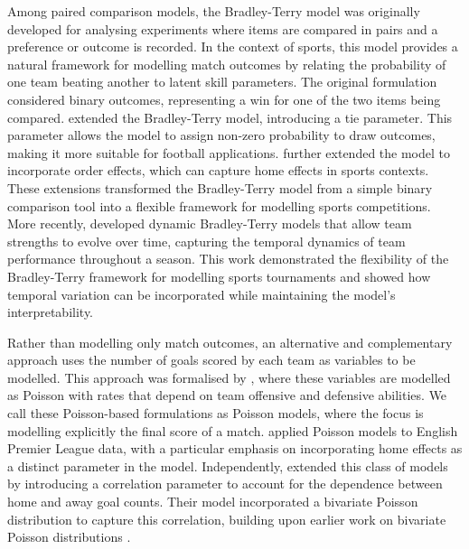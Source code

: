 Among paired comparison models, the Bradley-Terry model \cite{bradley_terry_1952} was originally developed for analysing experiments where items are compared in pairs and a preference or outcome is recorded.
In the context of sports, this model provides a natural framework for modelling match outcomes by relating the probability of one team beating another to latent skill parameters.
The original formulation considered binary outcomes, representing a win for one of the two items being compared.
\textcite{davidson_1970} extended the Bradley-Terry model, introducing a tie parameter.
This parameter allows the model to assign non-zero probability to draw outcomes, making it more suitable for football applications.
\textcite{davidson_1977} further extended the model to incorporate order effects, which can capture home effects in sports contexts.
These extensions transformed the Bradley-Terry model from a simple binary comparison tool into a flexible framework for modelling sports competitions.
More recently, \textcite{cattelan_2013} developed dynamic Bradley-Terry models that allow team strengths to evolve over time, capturing the temporal dynamics of team performance throughout a season.
This work demonstrated the flexibility of the Bradley-Terry framework for modelling sports tournaments and showed how temporal variation can be incorporated while maintaining the model's interpretability.

Rather than modelling only match outcomes, an alternative and complementary approach uses the number of goals scored by each team as variables to be modelled.
This approach was formalised by \textcite{maher_1982}, where these variables are modelled as Poisson with rates that depend on team offensive and defensive abilities.
We call these Poisson-based formulations as Poisson models, where the focus is modelling explicitly the final score of a match.
\textcite{lee_1997} applied Poisson models to English Premier League data, with a particular emphasis on incorporating home effects as a distinct parameter in the model.
Independently, \textcite{dixon_1997} extended this class of models by introducing a correlation parameter to account for the dependence between home and away goal counts.
Their model incorporated a bivariate Poisson distribution to capture this correlation, building upon earlier work on bivariate Poisson distributions \cite{holgate_1964}.

